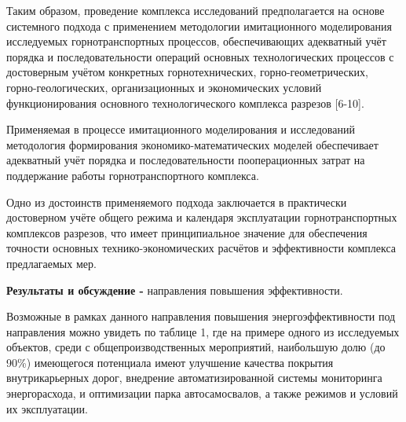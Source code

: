 \begin{multicols}{2}

Таким образом, проведение комплекса исследований предполагается на
основе системного подхода с применением методологии имитационного
моделирования исследуемых горнотранспортных процессов, обеспечивающих
адекватный учёт порядка и последовательности операций основных
технологических процессов с достоверным учётом конкретных
горнотехнических, горно-геометрических, горно-геологических,
организационных и экономических условий функционирования основного
технологического комплекса разрезов {[}6-10{]}.

Применяемая в процессе имитационного моделирования и исследований
методология формирования экономико-математических моделей обеспечивает
адекватный учёт порядка и последовательности пооперационных затрат на
поддержание работы горнотранспортного комплекса.

Одно из достоинств применяемого подхода заключается в практически
достоверном учёте общего режима и календаря эксплуатации
горнотранспортных комплексов разрезов, что имеет принципиальное значение
для обеспечения точности основных технико-экономических расчётов и
эффективности комплекса предлагаемых мер.

{\bfseries Результаты и обсуждение -} направления повышения эффективности.

Возможные в рамках данного направления повышения энергоэффективности под
направления можно увидеть по таблице 1, где на примере одного из
исследуемых объектов, среди с общепроизводственных мероприятий,
наибольшую долю (до 90\%) имеющегося потенциала имеют улучшение качества
покрытия внутрикарьерных дорог, внедрение автоматизированной системы
мониторинга энергорасхода, и оптимизации парка автосамосвалов, а также
режимов и условий их эксплуатации.
\end{multicols}


